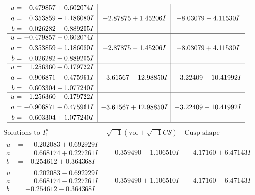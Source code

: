 \documentclass[1p]{elsarticle_modified}
\theoremstyle{definition}
\newcommand{\I}{\sqrt{-1}}
\begin{document}
$$\begin{array}{c|c|c}
\begin{aligned}
u &= -0.479857 + 0.602074 I \\
a &= \phantom{-}0.353859 - 1.186080 I \\
b &= \phantom{-}0.026282 - 0.889205 I\end{aligned}
 & -2.87875 + 1.45206 I & -8.03079 - 4.11530 I \\ \hline\begin{aligned}
u &= -0.479857 - 0.602074 I \\
a &= \phantom{-}0.353859 + 1.186080 I \\
b &= \phantom{-}0.026282 + 0.889205 I\end{aligned}
 & -2.87875 - 1.45206 I & -8.03079 + 4.11530 I \\ \hline\begin{aligned}
u &= \phantom{-}1.256360 + 0.179722 I \\
a &= -0.906871 - 0.475961 I \\
b &= \phantom{-}0.603304 - 1.077240 I\end{aligned}
 & -3.61567 - 12.98850 I & -3.22409 + 10.41992 I \\ \hline\begin{aligned}
u &= \phantom{-}1.256360 - 0.179722 I \\
a &= -0.906871 + 0.475961 I \\
b &= \phantom{-}0.603304 + 1.077240 I\end{aligned}
 & -3.61567 + 12.98850 I & -3.22409 - 10.41992 I\\
 \hline 
 \end{array}$$\newpage$$\begin{array}{c|c|c}  
\text{Solutions to }I^u_{1}& \I (\text{vol} + \sqrt{-1}CS) & \text{Cusp shape}\\
 \hline 
\begin{aligned}
u &= \phantom{-}0.202083 + 0.692929 I \\
a &= \phantom{-}0.668174 + 0.227261 I \\
b &= -0.254612 + 0.364368 I\end{aligned}
 & \phantom{-}0.359490 - 1.106510 I & \phantom{-}4.17160 + 6.47143 I \\ \hline\begin{aligned}
u &= \phantom{-}0.202083 - 0.692929 I \\
a &= \phantom{-}0.668174 - 0.227261 I \\
b &= -0.254612 - 0.364368 I\end{aligned}
 & \phantom{-}0.359490 + 1.106510 I & \phantom{-}4.17160 - 6.47143 I \\ \hline\begin{aligned}

\end{aligned}
\end{array}$$
\end{document}
